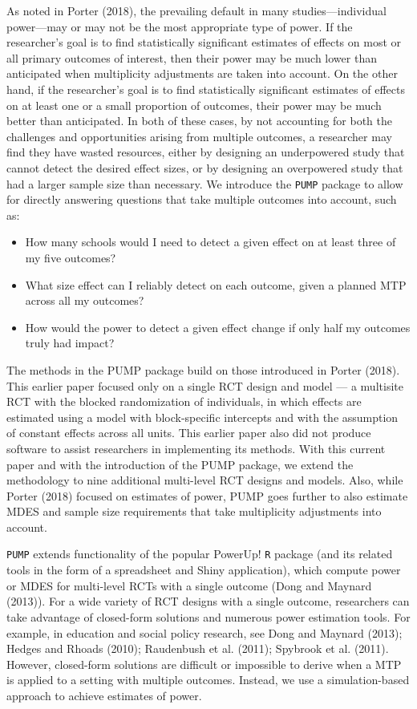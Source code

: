 \documentclass[
]{article}
\providecommand{\tightlist}{%
  \setlength{\itemsep}{0pt}\setlength{\parskip}{0pt}}
\begin{document}
As noted in Porter (2018), the prevailing default in many
studies---individual power---may or may not be the most appropriate type
of power. If the researcher's goal is to find statistically significant
estimates of effects on most or all primary outcomes of interest, then
their power may be much lower than anticipated when multiplicity
adjustments are taken into account. On the other hand, if the
researcher's goal is to find statistically significant estimates of
effects on at least one or a small proportion of outcomes, their power
may be much better than anticipated. In both of these cases, by not
accounting for both the challenges and opportunities arising from
multiple outcomes, a researcher may find they have wasted resources,
either by designing an underpowered study that cannot detect the desired
effect sizes, or by designing an overpowered study that had a larger
sample size than necessary. We introduce the \texttt{PUMP} package to
allow for directly answering questions that take multiple outcomes into
account, such as:

\begin{itemize}
\tightlist
\item
  How many schools would I need to detect a given effect on at least
  three of my five outcomes?
\item
  What size effect can I reliably detect on each outcome, given a
  planned MTP across all my outcomes?
\item
  How would the power to detect a given effect change if only half my
  outcomes truly had impact?
\end{itemize}

The methods in the PUMP package build on those introduced in Porter
(2018). This earlier paper focused only on a single RCT design and model
--- a multisite RCT with the blocked randomization of individuals, in
which effects are estimated using a model with block-specific intercepts
and with the assumption of constant effects across all units. This
earlier paper also did not produce software to assist researchers in
implementing its methods. With this current paper and with the
introduction of the PUMP package, we extend the methodology to nine
additional multi-level RCT designs and models. Also, while Porter (2018)
focused on estimates of power, PUMP goes further to also estimate MDES
and sample size requirements that take multiplicity adjustments into
account.

\texttt{PUMP} extends functionality of the popular PowerUp! \texttt{R}
package (and its related tools in the form of a spreadsheet and Shiny
application), which compute power or MDES for multi-level RCTs with a
single outcome (Dong and Maynard (2013)). For a wide variety of RCT
designs with a single outcome, researchers can take advantage of
closed-form solutions and numerous power estimation tools. For example,
in education and social policy research, see Dong and Maynard (2013);
Hedges and Rhoads (2010); Raudenbush et al. (2011); Spybrook et al.
(2011). However, closed-form solutions are difficult or impossible to
derive when a MTP is applied to a setting with multiple outcomes.
Instead, we use a simulation-based approach to achieve estimates of
power.
\end{document}
